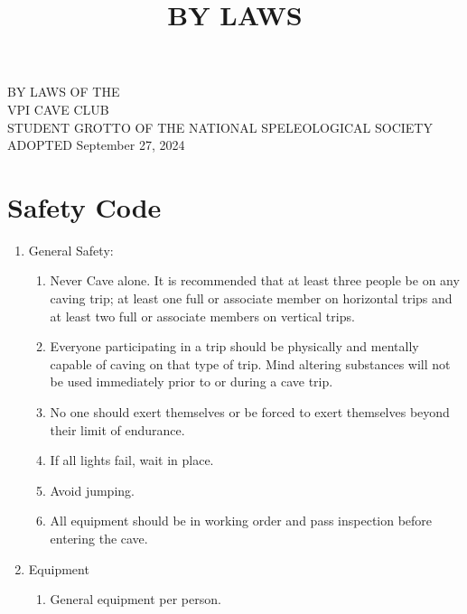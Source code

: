 \documentclass[
]{article}
\title{BY LAWS}
\author{}
\date{}
\providecommand{\tightlist}{%
  \setlength{\itemsep}{0pt}\setlength{\parskip}{0pt}}
\begin{document}
\maketitle

{
\setcounter{tocdepth}{3}
\tableofcontents
}
\newpage{}

BY LAWS OF THE\\
VPI CAVE CLUB\\
STUDENT GROTTO OF THE NATIONAL SPELEOLOGICAL SOCIETY\\
ADOPTED September 27, 2024

\hypertarget{safety-code}{%
\section{Safety Code}\label{safety-code}}

\begin{enumerate}
\def\labelenumi{\arabic{enumi}.}
\tightlist
\item
  General Safety:

  \begin{enumerate}
  \def\labelenumii{\Alph{enumii}.}
  \tightlist
  \item
    Never Cave alone. It is recommended that at least three people be on
    any caving trip; at least one full or associate member on horizontal
    trips and at least two full or associate members on vertical trips.
  \item
    Everyone participating in a trip should be physically and mentally
    capable of caving on that type of trip. Mind altering substances
    will not be used immediately prior to or during a cave trip.
  \item
    No one should exert themselves or be forced to exert themselves
    beyond their limit of endurance.
  \item
    If all lights fail, wait in place.
  \item
    Avoid jumping.
  \item
    All equipment should be in working order and pass inspection before
    entering the cave.
  \end{enumerate}
\item
  Equipment

  \begin{enumerate}
  \def\labelenumii{\Alph{enumii}.}
  \tightlist
  \item
    General equipment per person.


\end{enumerate}
\end{enumerate}
\end{document}
